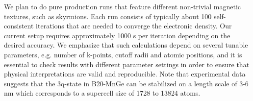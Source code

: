 \documentclass [a4paper, 12pt]{article}
\begin{document}

We plan to do pure production runs that feature different non-trivial magnetic textures, such as skyrmions.
Each run consists of typically about 100 self-consistent iterations that are needed to converge
the electronic density. Our current setup requires approximately 1000 s per iteration depending on the desired
accuracy. We emphasize that such calculations depend on several tunable parameters, e.g. number of
k-points, cutoff radii and atomic positions, and it is essential to check results with different parameter
settings in order to ensure that physical interpretations are valid and reproducible. 
Note that
experimental data suggests that the 3q-state in B20-MnGe can be stabilized on a length scale 
of 3-6 nm which corresponds to a supercell size of
1728 to 13824 atoms.



\bigskip
\end{document}

